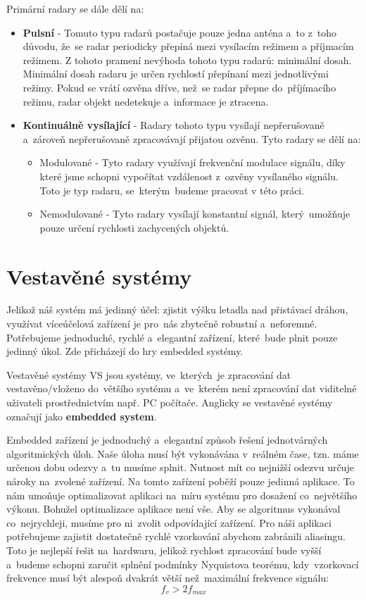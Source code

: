 			Primární radary se dále dělí na:
			\begin{itemize}
				\item \textbf{Pulsní}	-	Tomuto typu radarů postačuje pouze jedna anténa a~to z~toho důvodu, že~se radar periodicky přepíná mezi vysílacím režimem a příjmacím režimem. Z tohoto pramení nevýhoda tohoto typu radarů: minimální dosah. Minimální dosah radaru je určen rychlostí přepínaní mezi jednotlivými režimy. Pokud se vrátí ozvěna dříve, než~se radar přepne do~příjímacího režimu, radar objekt nedetekuje a~informace je ztracena.
				
				\item \textbf{Kontinuálně vysílající}	-	Radary tohoto typu vysílají nepřerušovaně a~zároveň nepřerušovaně zpracovávají přijatou ozvěnu. Tyto radary se dělí na:
					\begin{itemize}
						\item Modulované - Tyto radary využívají frekvenční modulace signálu, díky které jsme schopni vypočítat vzdálenost z~ozvěny vysílaného signálu. Toto je typ radaru, se~kterým~budeme pracovat v této práci.
						
						\item Nemodulované - Tyto radary vysílají konstantní signál, který~umožňuje pouze určení rychlosti zachycených objektů.
					\end{itemize}
			\end{itemize}
		
		\section{Vestavěné systémy}
			Jelikož náš systém má jedinný účel: zjistit výšku letadla nad přistávací dráhou, využívat víceúčelová zařízení je pro~nás zbytečně robustní a~neforemné. Potřebujeme jednoduché, rychlé a~elegantní zařízení, které~bude plnit pouze jedinný úkol. Zde přicházejí do hry embedded systémy.
			
			\begin{definice}
				Vestavěné systémy VS jsou systémy, ve~kterých~je zpracování dat vestavěno/vloženo do~většího systému a~ve~kterém není zpracování dat viditelné uživateli prostřednictvím např. PC počítače. Anglicky se vestavěné systémy označují jako \textbf{embedded system}\cite{impSkripta}.
			\end{definice}
			
			Embedded zařízení je jednoduchý a~elegantní způsob řešení jednotvárných algoritmických úloh. Naše úloha musí být vykonávána v~reálném čase, tzn. máme určenou dobu odezvy a~tu musíme splnit. Nutnost mít co nejnižší odezvu určuje nároky na~zvolené zařízení. Na tomto zařízení poběží pouze jedinná aplikace. To nám umoňuje optimalizovat aplikaci na~míru systému pro dosažení co~největšího výkonu.
			Bohužel optimalizace aplikace není vše. Aby se algoritmus vykonával co~nejrychleji, musíme pro ni~zvolit odpovídající zařízení. Pro náši aplikaci potřebujeme zajistit dostatečně rychlé vzorkování abychom zabránili aliasingu. Toto je nejlepší řešit na~hardwaru, jelikož rychlost zpracování bude vyšší a~budeme schopni zaručit splnění podmínky Nyquistova teorému, kdy~vzorkovací frekvence musí být alespoň dvakrát větší než~maximální frekvence signálu: \[f_v > 2f_{max}\]
			
